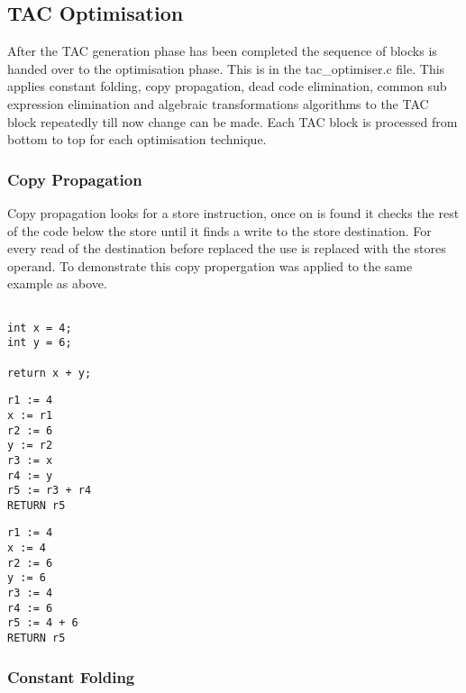 \documentclass{article}
\begin{document}
\subsection{TAC Optimisation}

After the TAC generation phase has been completed the sequence of blocks is handed
over to the optimisation phase. This is in the tac\_optimiser.c file. This applies
constant folding, copy propagation, dead code elimination, common sub expression
elimination and algebraic transformations algorithms to the TAC block repeatedly till
now change can be made. Each TAC block is processed from bottom to top for each
optimisation technique.

\subsubsection{Copy Propagation}

Copy propagation looks for a store instruction, once on is found it checks the
rest of the code below the store until it finds a write to the store destination.
For every read of the destination before replaced the use is replaced with the
stores operand. To demonstrate this copy propergation was applied to the same example
as above.

\begin{minipage}{0.3\textwidth}
\begin{lstlisting}

int x = 4;
int y = 6;

return x + y;

\end{lstlisting}
\end{minipage}%
\begin{minipage}{0.3\textwidth}
\begin{lstlisting}
r1 := 4
x := r1
r2 := 6
y := r2
r3 := x
r4 := y
r5 := r3 + r4
RETURN r5

\end{lstlisting}
\end{minipage}%
\begin{minipage}{0.3\textwidth}
\begin{lstlisting}
r1 := 4
x := 4
r2 := 6
y := 6
r3 := 4
r4 := 6
r5 := 4 + 6
RETURN r5
\end{lstlisting}
\end{minipage}%

\subsubsection{Constant Folding}
\end{document}
